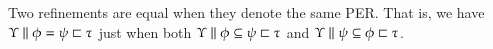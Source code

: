 \documentclass[11pt]{article}
\theoremstyle{definition}
\theoremstyle{remark}
\numberwithin{equation}{section}
\def\IModeColorName{MidnightBlue}
\def\OModeColorName{Maroon}
\def\IModeColorName{Black}
\def\OModeColorName{Black}
\newcommand\IMode[1]{{\color{\IModeColorName}{#1}}}
\newcommand\OMode[1]{{\color{\OModeColorName}{#1}}}
\newcommand\Of[2]{\IMode{#1}: \IMode{#2}}
\newcommand\IsVarCtx[1]{\IMode{#1}\ \textit{vctx}}
\newcommand\IsAbtUnmoded[5]{
  #1\triangleright%
  #2\parallel%
  #3\vdash%
  #4:\OMode{#5}%
}
\newcommand\IsAbt[5]{\IsAbtUnmoded{\IMode{#1}}{\IMode{#2}}{\IMode{#3}}{\IMode{#4}}{\OMode{#5}}}
\newcommand\Refines[3]{\IMode{#1}\parallel\IMode{#2}\sqsubset\OMode{#3}}
\newcommand\RefinesCtx[2]{\IMode{#1}\sqsubset^\star\OMode{#2}}
\newcommand\EqRefines[4]{\IMode{#1}\parallel\IMode{#2}=\IMode{#3}\sqsubset\OMode{#4}}
\newcommand\HRefines[4]{\IMode{#1}\parallel\IMode{#2}\vDash\IMode{#3}\sqsubset\OMode{#4}}
\newcommand\HEqRefines[5]{\IMode{#1}\parallel\IMode{#2}\vDash\IMode{#3}=\IMode{#4}\sqsubset\OMode{#5}}
\newcommand\PRefinesCtx[3]{\IMode{#1}\parallel\IMode{#2}\sqsubset^\star\OMode{#3}}
\newcommand\RMemEq[4]{\IMode{#1}\parallel\IMode{#2}=\IMode{#3}\in\IMode{#4}}
\newcommand\HRMemEq[5]{\IMode{#1}\parallel\IMode{#2}\vDash\IMode{#3}=\IMode{#4}\in\IMode{#5}}
\newcommand\SubRefines[4]{\IMode{#1}\parallel\IMode{#2}\subseteq\IMode{#3}\sqsubset\OMode{#4}}
\begin{document}
Two refinements are equal when they denote the same PER. That is, we have
$\EqRefines{\Upsilon}{\phi}{\psi}{\tau}$ just when both
$\SubRefines{\Upsilon}{\phi}{\psi}{\tau}$ and
$\SubRefines{\Upsilon}{\psi}{\phi}{\tau}$.


\end{document}
